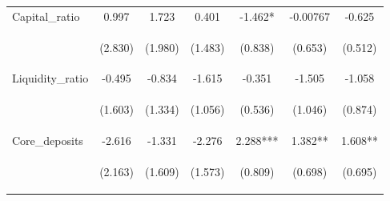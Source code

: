 \documentclass[]{article}
\begin{document}
\begin{center}
\begin{tabular}{lcccccc}
Capital\_ratio & 0.997 & 1.723 & 0.401 & -1.462* & -0.00767 & -0.625 \\
\vspace{4pt} & \begin{footnotesize}(2.830)\end{footnotesize} & \begin{footnotesize}(1.980)\end{footnotesize} & \begin{footnotesize}(1.483)\end{footnotesize} & \begin{footnotesize}(0.838)\end{footnotesize} & \begin{footnotesize}(0.653)\end{footnotesize} & \begin{footnotesize}(0.512)\end{footnotesize} \\
Liquidity\_ratio & -0.495 & -0.834 & -1.615 & -0.351 & -1.505 & -1.058 \\
\vspace{4pt} & \begin{footnotesize}(1.603)\end{footnotesize} & \begin{footnotesize}(1.334)\end{footnotesize} & \begin{footnotesize}(1.056)\end{footnotesize} & \begin{footnotesize}(0.536)\end{footnotesize} & \begin{footnotesize}(1.046)\end{footnotesize} & \begin{footnotesize}(0.874)\end{footnotesize} \\
Core\_deposits & -2.616 & -1.331 & -2.276 & 2.288*** & 1.382** & 1.608** \\
\vspace{4pt} & \begin{footnotesize}(2.163)\end{footnotesize} & \begin{footnotesize}(1.609)\end{footnotesize} & \begin{footnotesize}(1.573)\end{footnotesize} & \begin{footnotesize}(0.809)\end{footnotesize} & \begin{footnotesize}(0.698)\end{footnotesize} & \begin{footnotesize}(0.695)\end{footnotesize} \\

\end{tabular}
\end{center}
\end{document}
